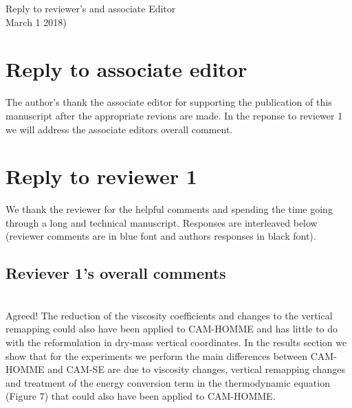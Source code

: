 \documentclass[11pt]{article}
\begin{document}
\begin{center}
 {\large   \sf Reply to reviewer's and associate Editor}\\
    \vspace{.1in}
    March 1 2018)
  \end{center}
\section{Reply to associate editor}
{\color{blue}{Associate Editor (Remarks to Author):\\

Both reviewers commented on the switch to a dry-mass vertical coordinate but with opposite reactions. I think it would be helpful to the paper, and to assuage \# 1, by providing more evidence of the benefits of the switch to dry-mass. Other than that, I think the paper fits the purpose of a documentation paper for the CESM special issue.}}

The author's thank the associate editor for supporting the publication of this manuscript after the appropriate revions are made. In the reponse to reviewer 1 we will address the associate editors overall comment.
\section{Reply to reviewer 1}
We thank the reviewer for the helpful comments and spending the time going through a long and technical manuscript. Responses are interleaved below (reviewer comments are in blue font and authors responses in black font). 
\subsection{Reviever 1's overall comments}
{\color{blue}{
This is a well-written and mostly comprehensive paper describing a new dynamical core, and should be published to document the advances described within and the dynamical core characteristics.}}

{\color{blue}{
 I do feel that some of the major changes compared with the earlier CAM-HOMME are not well-justified, while some of the improvements demonstrated (especially with regard to the kinetic energy spectrum) are a re-configuration of the model and not intrinsic to the core formulation.}}\\

Agreed! The reduction of the viscosity coefficients and changes to the vertical remapping could also have been applied to CAM-HOMME and has little to do with the reformulation in dry-mass vertical coordinates. In the results section we show that for the experiments we perform the main differences between CAM-HOMME and CAM-SE are due to viscosity changes, vertical remapping changes and treatment of the energy conversion term in the thermodynamic equation (Figure 7) that could also have been applied to CAM-HOMME.\\
\end{document}
